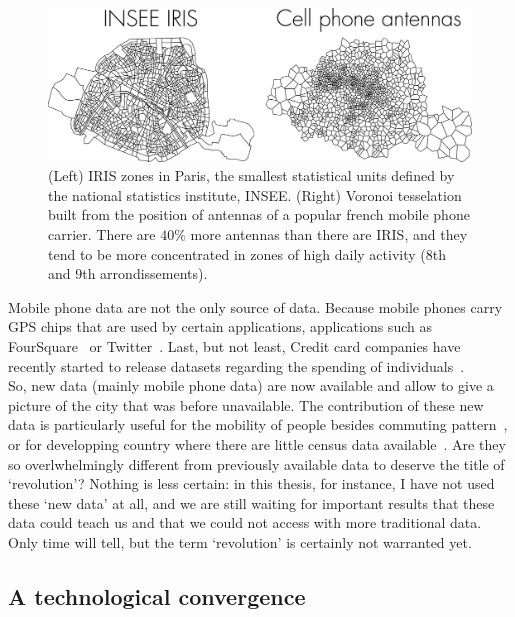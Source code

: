 \begin{figure}
    \centering
    \includegraphics[width=\textwidth]{gfx/chapter-intro/IRIS_phone.pdf}
    \caption{(Left) IRIS zones in Paris, the smallest statistical units defined
    by the national statistics institute, INSEE. (Right) Voronoi tesselation
    built from the position of antennas of a popular french mobile phone carrier.
    There are $40\%$ more antennas than there are IRIS, and they tend to be more
    concentrated in zones of high daily activity (8th and 9th
    arrondissements).\label{fig:IRIS_phone}}
\end{figure}

Mobile phone data are not the only source of data. Because mobile phones carry
GPS chips that are used by certain applications, applications such as
FourSquare~\cite{Noulas:2012} or Twitter~\cite{Lenormand:2014_tweets}. Last, but
not least, Credit card companies have recently started to release datasets
regarding the spending of individuals~\cite{Lenormand:2015}.\\

So, new data (mainly mobile phone data) are now available and allow to give a
picture of the city that was before unavailable. The contribution of these new
data is particularly useful for the mobility of people besides commuting
pattern~\cite{Louail:2014}, or for developping country where there are little
census data available~\cite{Blondel:2012}. Are they so overlwhelmingly different
from previously available data to deserve the title of `revolution'? Nothing is
less certain: in this thesis, for instance, I have not used these `new data' at
all, and we are still waiting for important results that these data could teach
us and that we could not access with more traditional data. Only time will tell,
but the term `revolution' is certainly not warranted yet.



\subsection{A technological convergence}
\label{sub:a_technological_convergence} 


